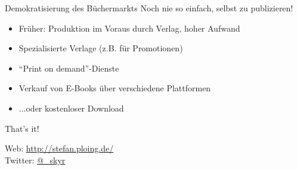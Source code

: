 \documentclass[hyperref={pdfpagelabels=false}]{beamer}
\begin{document}
\begin{frame}{Demokratisierung des Büchermarkts}
	Noch nie so einfach, selbst zu publizieren!
	\begin{itemize}
		\item Früher: Produktion im Voraus durch Verlag, hoher Aufwand
		\item<2-> Spezialisierte Verlage (z.B. für Promotionen)
		\item<3-> "`Print on demand"'-Dienste
		\item<4-> Verkauf von E-Books über verschiedene Plattformen
		\item<4-> ...oder kostenloser Download
	\end{itemize}
\end{frame}


\begin{frame}[plain]
	That's it!
	\begin{center}
	\end{center}
	\begin{center}
		Web: \url{http://stefan.ploing.de/} \\
		Twitter: \href{https://twitter.com/\_skyr}{@\_skyr}
	\end{center}
\end{frame}


\end{document}
